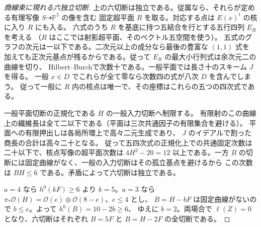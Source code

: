 \begin{proof}[商線束に現れる六独立切断]
上の六切断は独立である。従属なら、それらが定める有理写像 $S\dashrightarrow\mathbb P^5$ の像を含む
固定超平面 $R$ を取る。対応する点は $E(x)^t$ の核に入り $R$ にも入る。
六式のうち $R$ を基底に持つ五結合を行とする五行四列 $E_R$ を考える
（$R$ はここでは射影超平面、そのベクトル五空間を使う）。
五式のグラフの次元は一以下である。二次元以上の成分なら最後の豊富な $(1,1)$ 式を
加えても正次元基点が残るからである。従って $E_R$ の最大小行列式は余次元二の曲線を切り、
Hilbert--Burchで次数十である。一般平面では長さ十のスキーム $J$ を得る。
一般 $x\in D$ でこれらが全て零なら次数四の式が八次 $D$ を含んでしまう。
従って一般に $R$ 内の核点は唯一で、その座標はこれらの五つの四次式である。

一般平面切断の正規化である $H$ の一般入力切断へ制限する。
有限射のこの曲線上の繊維長は全て二以下である（平面は三次共通因子の有限集合を避ける）。
平面への有限押出しは各局所環上で高々二元生成であり、
$J$ のイデアルで割った商長の合計は高々二十となる。
従って五四次式の正規化上での共通固定次数は二十以下で、核点写像の超平面次数は
$4H^2-20=12$ 以上である。一方 $B$ の切断には固定曲線がなく、一般の入力切断はその孤立基点を避けるから
この次数は $BH\le6$ である。矛盾によって六切断は独立である。

$a=4$ なら $h^0(kF)\ge6$ より $k=5$。$a=3$ なら
$\pi_*\mathcal O(H)=\mathcal O(e)\oplus\mathcal O(8-e)$、$e\le4$ とし、
$B=H-bF$ は固定曲線がないので $b\le e$。よって $h^0(B)=10-2b\ge6$、
ゆえに $b=2$。両場合で $\ell(Z)=0$ となり、六切断はそれぞれ
$B=5F$ と $B=H-2F$ の全切断である。
\end{proof}

